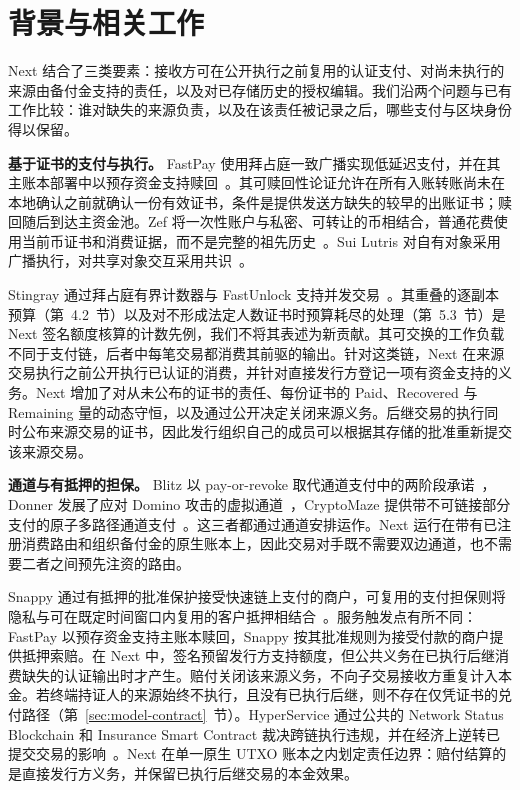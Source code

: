 \section{背景与相关工作}
\label{sec:related}

Next 结合了三类要素：接收方可在公开执行之前复用的认证支付、对尚未执行的来源由备付金支持的责任，以及对已存储历史的授权编辑。我们沿两个问题与已有工作比较：谁对缺失的来源负责，以及在该责任被记录之后，哪些支付与区块身份得以保留。

\noindent\textbf{基于证书的支付与执行。}
FastPay 使用拜占庭一致广播实现低延迟支付，并在其主账本部署中以预存资金支持赎回~\cite{fastpay}。其可赎回性论证允许在所有入账转账尚未在本地确认之前就确认一份有效证书，条件是提供发送方缺失的较早的出账证书；赎回随后到达主资金池。Zef 将一次性账户与私密、可转让的币相结合，普通花费使用当前币证书和消费证据，而不是完整的祖先历史~\cite{zef}。Sui Lutris 对自有对象采用广播执行，对共享对象交互采用共识~\cite{lutris}。

Stingray 通过拜占庭有界计数器与 FastUnlock 支持并发交易~\cite{stingray}。其重叠的逐副本预算（第~4.2~节）以及对不形成法定人数证书时预算耗尽的处理（第~5.3~节）是 Next 签名额度核算的计数先例，我们不将其表述为新贡献。其可交换的工作负载不同于支付链，后者中每笔交易都消费其前驱的输出。针对这类链，Next 在来源交易执行之前公开执行已认证的消费，并针对直接发行方登记一项有资金支持的义务。Next 增加了对从未公布的证书的责任、每份证书的 Paid、Recovered 与 Remaining 量的动态守恒，以及通过公开决定关闭来源义务。后继交易的执行同时公布来源交易的证书，因此发行组织自己的成员可以根据其存储的批准重新提交该来源交易。

\noindent\textbf{通道与有抵押的担保。}
Blitz 以 pay-or-revoke 取代通道支付中的两阶段承诺~\cite{blitz}，Donner 发展了应对 Domino 攻击的虚拟通道~\cite{donner}，CryptoMaze 提供带不可链接部分支付的原子多路径通道支付~\cite{cryptomaze}。这三者都通过通道安排运作。Next 运行在带有已注册消费路由和组织备付金的原生账本上，因此交易对手既不需要双边通道，也不需要二者之间预先注资的路由。

Snappy 通过有抵押的批准保护接受快速链上支付的商户，可复用的支付担保则将隐私与可在既定时间窗口内复用的客户抵押相结合~\cite{snappy,reusable}。服务触发点有所不同：FastPay 以预存资金支持主账本赎回，Snappy 按其批准规则为接受付款的商户提供抵押索赔。在 Next 中，签名预留发行方支持额度，但公共义务在已执行后继消费缺失的认证输出时才产生。赔付关闭该来源义务，不向子交易接收方重复计入本金。若终端持证人的来源始终不执行，且没有已执行后继，则不存在仅凭证书的兑付路径（第~\ref{sec:model-contract}~节）。HyperService 通过公共的 Network Status Blockchain 和 Insurance Smart Contract 裁决跨链执行违规，并在经济上逆转已提交交易的影响~\cite{web3}。Next 在单一原生 UTXO 账本之内划定责任边界：赔付结算的是直接发行方义务，并保留已执行后继交易的本金效果。

